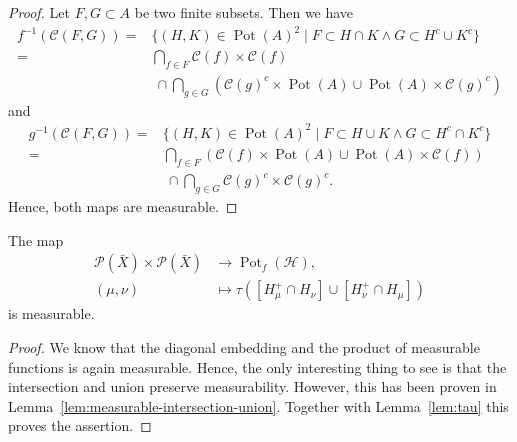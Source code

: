 \begin{proof}
  \label{lem:measurable-intersection-union}
  Let \(F, G \subset A\) be two finite subsets. Then we have
  \begin{align*}
    f^{-1}(\mathcal{C}(F,G))
    = & \{(H,K) \in \operatorname{Pot}(A)^2 \mid F \subset H \cap K \wedge G \subset H^c \cup K^c\} \\
    = & \bigcap_{f \in F} \mathcal{C}(f) \times \mathcal{C}(f)\\
    &\ \cap \bigcap_{g \in G} (\mathcal{C}(g)^c \times \operatorname{Pot}(A) \cup \operatorname{Pot}(A) \times \mathcal{C}(g)^c)
  \end{align*}
  and
  \begin{align*}
    g^{-1}(\mathcal{C}(F,G))
     = & \{(H,K) \in \operatorname{Pot}(A)^2 \mid F \subset H \cup K \wedge G \subset H^c \cap K^c\} \\
    = & \bigcap_{f \in F} (\mathcal{C}(f) \times \operatorname{Pot}(A) \cup \operatorname{Pot}(A) \times\mathcal{C}(f))\\
    &\ \cap \bigcap_{g \in G} \mathcal{C}(g)^c \times \mathcal{C}(g)^c.
  \end{align*}
  Hence, both maps are measurable.
\end{proof}

\begin{lemma}
  \label{lem:measurable-tau-int}
  The map
  \begin{align*}
    \mathcal{P}(\bar X) \times \mathcal{P}(\bar X) &\to \operatorname{Pot}_f(\mathcal{H}),\\
    (\mu,\nu) &\mapsto \tau([H_\mu^+ \cap H_\nu] \cup [H_\nu^+ \cap H_\mu])
  \end{align*}
  is measurable.
\end{lemma}

\begin{proof}
  We know that the diagonal embedding and the product of measurable functions is again measurable. Hence, the only interesting thing to see is that the intersection and union preserve measurability. However, this has been proven in Lemma~\ref{lem:measurable-intersection-union}. Together with Lemma~\ref{lem:tau} this proves the assertion.
\end{proof}

